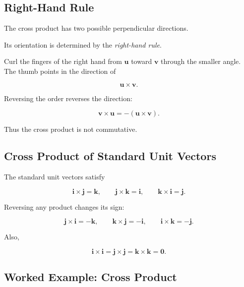 \subsection{Right-Hand Rule}
\label{subsec:right-hand-rule}

The cross product has two possible perpendicular directions.

Its orientation is determined by the \emph{right-hand rule}.

Curl the fingers of the right hand from \(\mathbf{u}\) toward
\(\mathbf{v}\) through the smaller angle. The thumb points in the direction
of

\[ \mathbf{u}\times\mathbf{v}. \]

Reversing the order reverses the direction:

\[ \boxed{\mathbf{v}\times\mathbf{u}=-(\mathbf{u}\times\mathbf{v}).} \]

Thus the cross product is not commutative.

\subsection{Cross Product of Standard Unit Vectors}
\label{subsec:cross-standard-unit-vectors}

The standard unit vectors satisfy

\[
\boxed{
\mathbf{i}\times\mathbf{j}=\mathbf{k},\qquad
\mathbf{j}\times\mathbf{k}=\mathbf{i},\qquad
\mathbf{k}\times\mathbf{i}=\mathbf{j}.
}
\]

Reversing any product changes its sign:

\[
\mathbf{j}\times\mathbf{i}=-\mathbf{k},\qquad
\mathbf{k}\times\mathbf{j}=-\mathbf{i},\qquad
\mathbf{i}\times\mathbf{k}=-\mathbf{j}.
\]

Also,

\[ \mathbf{i}\times\mathbf{i}
=\mathbf{j}\times\mathbf{j}
=\mathbf{k}\times\mathbf{k}
=\mathbf{0}. \]

\subsection{Worked Example: Cross Product}
\label{subsec:worked-cross-product}

